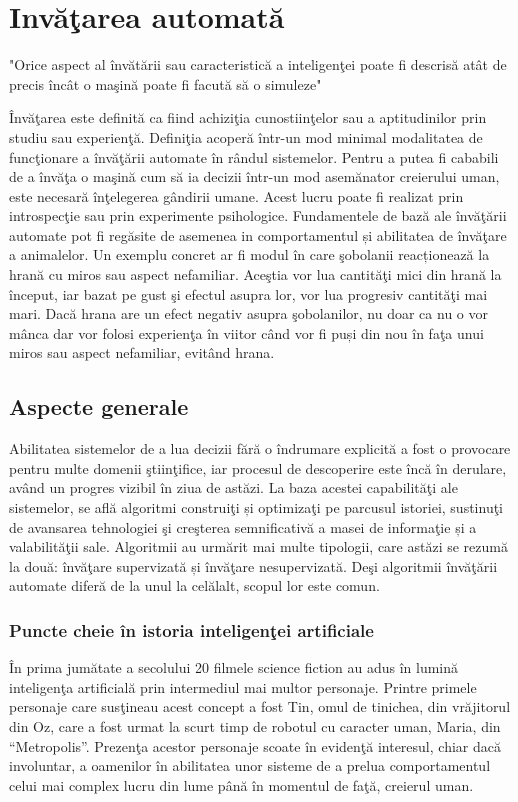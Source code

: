
	
	\chapter{Invăţarea automată}
	
		\begin{center}
		"Orice aspect al învătării sau caracteristică a inteligenţei poate fi descrisă atât de precis încât o maşină poate fi facută să o simuleze"\cite{mccarthy_proposal} 
		\end{center}
	
	Învăţarea este definită ca fiind achiziţia cunostiinţelor sau a aptitudinilor prin studiu sau experienţă. Definiţia acoperă într-un mod minimal modalitatea de funcţionare a învăţării automate în rândul sistemelor. Pentru a putea fi cababili de a învăţa o maşină cum să ia decizii într-un mod asemănator creierului uman, este necesară înţelegerea gândirii umane. Acest lucru poate fi realizat prin introspecţie sau prin experimente psihologice.  
	Fundamentele de bază ale învăţării automate pot fi regăsite de asemenea in comportamentul și abilitatea de învăţare a animalelor. Un exemplu concret ar fi modul în care şobolanii reacționează la hrană cu miros sau aspect nefamiliar. Aceştia vor lua cantităţi mici din hrană la început, iar bazat pe gust şi efectul asupra lor, vor lua progresiv cantităţi mai mari. Dacă hrana are un efect negativ asupra şobolanilor, nu doar ca nu o vor mânca dar vor folosi experienţa în viitor când vor fi puși din nou în faţa unui miros sau aspect nefamiliar, evitând hrana. 
	
	\section{Aspecte generale}
	Abilitatea sistemelor de a lua decizii fără o îndrumare explicită a fost o provocare pentru multe domenii ştiinţifice, iar procesul de descoperire este încă în derulare, având un progres vizibil în ziua de astăzi. La baza acestei capabilităţi ale sistemelor, se află algoritmi construiţi și optimizaţi pe parcusul istoriei, sustinuţi de avansarea tehnologiei şi creşterea semnificativă a masei de informaţie și a valabilităţii sale. 
	Algoritmii au urmărit mai multe tipologii, care astăzi se rezumă la două: învăţare supervizată și învăţare nesupervizată. Deşi algoritmii învăţării automate diferă de la unul la celălalt, scopul lor este comun.
	
	\subsection{Puncte cheie în istoria inteligenţei artificiale}
	În prima jumătate a secolului 20 filmele science fiction au adus în lumină inteligenţa artificială prin intermediul mai multor personaje. Printre primele personaje care susţineau acest concept a fost Tin, omul de tinichea, din vrăjitorul din Oz, care a fost urmat la scurt timp de robotul cu caracter uman, Maria, din “Metropolis”. Prezenţa acestor personaje scoate în evidenţă interesul, chiar dacă involuntar, a oamenilor în abilitatea unor sisteme de a prelua comportamentul celui mai complex lucru din lume până în momentul de faţă, creierul uman. 
	
